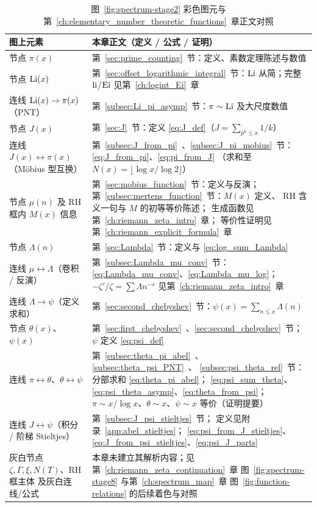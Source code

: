 \begin{table}[htbp]
\centering
\caption{图~\ref{fig:spectrum-stage2} 彩色图元与第~\ref{ch:elementary_number_theoretic_functions}~章正文对照}
\label{tab:spectrum-stage2-guide}
\small
\renewcommand{\arraystretch}{1.35}
\begin{tabular}{@{}p{4.8cm}p{8.4cm}@{}}
\toprule
\textbf{图上元素} & \textbf{本章正文（定义 / 公式 / 证明）} \\
\midrule
节点 $\pi(x)$ &
  第~\ref{sec:prime_counting}~节：定义、素数定理陈述与数值 \\
节点 $\operatorname{Li}(x)$ &
  第~\ref{sec:offset_logarithmic_integral}~节：$\operatorname{Li}$ 从简；完整 $\operatorname{li}$/$\operatorname{Ei}$ 见第~\ref{ch:logint_Ei}~章 \\
连线 $\operatorname{Li}(x)\to\pi(x)$（PNT） &
  第~\ref{subsec:Li_pi_asymp}~节：$\pi\sim\operatorname{Li}$ 及大尺度数值 \\
节点 $J(x)$ &
  第~\ref{sec:J}~节：定义 \eqref{eq:J_def}（$J=\sum_{p^k\le x}1/k$） \\
连线 $J(x)\leftrightarrow\pi(x)$
  （Möbius 型互换） &
  第~\ref{subsec:J_from_pi}~、\ref{subsec:J_pi_mobius}~节：
  \eqref{eq:J_from_pi}、\eqref{eq:pi_from_J}
  （求和至 $N(x)=\lfloor\log x/\log 2\rfloor$） \\
节点 $\mu(n)$ 及 RH 框内 $M(x)$ 信息 &
  第~\ref{sec:mobius_function}~节：定义与反演；
  第~\ref{subsec:mertens_function}~节：$M(x)$ 定义、
  RH 含义一句与 $M$ 的初等等价陈述；
  生成函数见第~\ref{ch:riemann_zeta_intro}~章；
  等价性证明见第~\ref{ch:riemann_explicit_formula}~章 \\
节点 $\Lambda(n)$ &
  第~\ref{sec:Lambda}~节：定义与 \eqref{eq:log_sum_Lambda} \\
连线 $\mu\leftrightarrow\Lambda$（卷积 / 反演） &
  第~\ref{subsec:Lambda_mu_conv}~节：
  \eqref{eq:Lambda_mu_conv}、\eqref{eq:Lambda_mu_log}；
  $-\zeta'/\zeta=\sum\Lambda n^{-s}$ 见第~\ref{ch:riemann_zeta_intro}~章 \\
连线 $\Lambda\to\psi$（定义求和） &
  第~\ref{sec:second_chebyshev}~节：$\psi(x)=\sum_{n\le x}\Lambda(n)$ \\
节点 $\theta(x)$、$\psi(x)$ &
  第~\ref{sec:first_chebyshev}~、\ref{sec:second_chebyshev}~节；
  $\psi$ 定义 \eqref{eq:psi_def} \\
连线 $\pi\leftrightarrow\theta$、$\theta\leftrightarrow\psi$ &
  第~\ref{subsec:theta_pi_abel}~、\ref{subsec:theta_psi_PNT}~、
  \ref{subsec:psi_theta_rel}~节：
  分部求和 \eqref{eq:theta_pi_abel}；
  \eqref{eq:psi_sum_theta}、\eqref{eq:psi_theta_asymp}、\eqref{eq:theta_from_psi}；
  $\pi\sim x/\log x$、$\theta\sim x$、$\psi\sim x$ 等价（证明提要） \\
连线 $J\leftrightarrow\psi$（积分 / 阶梯 Stieltjes） &
  第~\ref{subsec:J_psi_stieltjes}~节；
  定义见附录~\ref{app:abel_stieltjes}；
  \eqref{eq:psi_from_J_stieltjes}、\eqref{eq:J_from_psi_stieltjes}、\eqref{eq:psi_J_parts} \\
灰白节点 $\zeta,\Gamma,\xi,N(T)$、RH 框主体
  及灰白连线/公式 &
  本章未建立其解析内容；见第~\ref{ch:riemann_zeta_continuation}~章
  图~\ref{fig:spectrum-stage8} 与第~\ref{ch:spectrum_map}~章
  图~\ref{fig:function-relations} 的后续着色与对照 \\
\bottomrule
\end{tabular}
\end{table}

